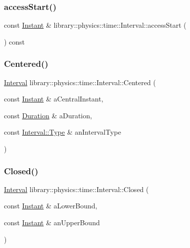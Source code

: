 \subsubsection{\texorpdfstring{access\+Start()}{accessStart()}}
{\footnotesize\ttfamily const \hyperlink{classlibrary_1_1physics_1_1time_1_1_instant}{Instant} \& library\+::physics\+::time\+::\+Interval\+::access\+Start (\begin{DoxyParamCaption}{ }\end{DoxyParamCaption}) const}

\mbox{\label{classlibrary_1_1physics_1_1time_1_1_interval_a052f385e80dea392c9ef5b52ed9443a1}} 
\subsubsection{\texorpdfstring{Centered()}{Centered()}}
{\footnotesize\ttfamily \hyperlink{classlibrary_1_1physics_1_1time_1_1_interval}{Interval} library\+::physics\+::time\+::\+Interval\+::\+Centered (\begin{DoxyParamCaption}\item[{const \hyperlink{classlibrary_1_1physics_1_1time_1_1_instant}{Instant} \&}]{a\+Central\+Instant,  }\item[{const \hyperlink{classlibrary_1_1physics_1_1time_1_1_duration}{Duration} \&}]{a\+Duration,  }\item[{const \hyperlink{classlibrary_1_1physics_1_1time_1_1_interval_aba490e7120a05be7b17a4d8076f25d48}{Interval\+::\+Type} \&}]{an\+Interval\+Type }\end{DoxyParamCaption})\hspace{0.3cm}{\ttfamily [static]}}

\mbox{\label{classlibrary_1_1physics_1_1time_1_1_interval_a89f1ca4a439fdc5224e60a441e757803}} 
\subsubsection{\texorpdfstring{Closed()}{Closed()}}
{\footnotesize\ttfamily \hyperlink{classlibrary_1_1physics_1_1time_1_1_interval}{Interval} library\+::physics\+::time\+::\+Interval\+::\+Closed (\begin{DoxyParamCaption}\item[{const \hyperlink{classlibrary_1_1physics_1_1time_1_1_instant}{Instant} \&}]{a\+Lower\+Bound,  }\item[{const \hyperlink{classlibrary_1_1physics_1_1time_1_1_instant}{Instant} \&}]{an\+Upper\+Bound }\end{DoxyParamCaption})\hspace{0.3cm}{\ttfamily [static]}}



